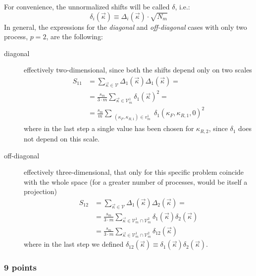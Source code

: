 For convenience, the unnormalized shifts will be called $\delta$, i.e.:
\begin{equation}
    \delta_i(\vec{\kappa}) \equiv \Delta_i(\vec{\kappa}) \cdot \sqrt{N_m}
\end{equation}
In general, the expressions for the \textit{diagonal} and \textit{off-diagonal}
cases with only two process, $p = 2$, are the following:
\begin{description}
    \item[diagonal] effectively two-dimensional, since both the shifts depend only on two scales
        \begin{align}
            S_{11} &= \sum_{\vec{\kappa} \in \mathcal{V}} \Delta_1(\vec{\kappa}) \Delta_1(\vec{\kappa}) =\\
                   &= \frac{s_m}{3 \cdot m} \sum_{\vec{\kappa} \in \mathcal{V}_m^1} \delta_1(\vec{\kappa})^2 =\\
                   &= \frac{s_m}{m} \sum_{\substack{(\kappa_F, \kappa_{R,1}) \in v_m^1 }} \delta_1(\kappa_F, \kappa_{R, 1}, 0)^2
            \label{eq:mhou/prescr/main-explicit-diag}
        \end{align}
        where in the last step a single value has been chosen for $\kappa_{R,
        2}$, since $\delta_1$ does not depend on this scale.
    \item[off-diagonal] effectively three-dimensional, that only for this
        specific problem coincide with the whole space (for a greater number of
        processes, would be itself a projection)
        \begin{align}
            S_{12} &= \sum_{\vec{\kappa} \in \mathcal{V}} \Delta_1(\vec{\kappa}) \Delta_2(\vec{\kappa}) =\\
                   &= \frac{s_m}{3 \cdot m} \sum_{\vec{\kappa} \in \mathcal{V}_m^1\cap\mathcal{V}_m^2} \delta_1(\vec{\kappa}) \delta_2(\vec{\kappa})\\
                   &= \frac{s_m}{3 \cdot m} \sum_{\vec{\kappa} \in \mathcal{V}_m^1\cap\mathcal{V}_m^2} \delta_{12}(\vec{\kappa})
            \label{eq:mhou/prescr/main-off-diag}
        \end{align}
        where in the last step we defined $\delta_{12}(\vec{\kappa}) \equiv \delta_1(\vec{\kappa})\delta_2(\vec{\kappa})$.
\end{description}

\subsubsection{9 points}

